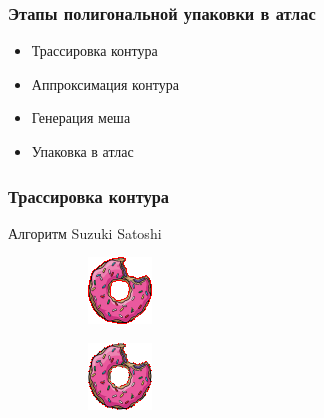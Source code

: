 \documentclass[10pt, unicode]{beamer}
\begin{document}
    \begin{frame}
        \frametitle{Этапы полигональной упаковки в атлас}
        \begin{itemize}
            \item Трассировка контура
            \item Аппроксимация контура
            \item Генерация меша
            \item Упаковка в атлас
        \end{itemize}
    \end{frame}
    \begin{frame}
        \frametitle{Трассировка контура}
        Алгоритм Suzuki Satoshi\cite{SuzukiAlgorithm}
        \begin{figure}[H]
            \centering
            \begin{subfigure}[l]{0.50\linewidth}
                \centering
                \includegraphics[scale=2]{donutpixel_contour_none.png}
            \end{subfigure}
            \begin{subfigure}{0.49\linewidth}
                \centering
                \includegraphics[scale=2]{donutpixel_contour_simple.png}
            \end{subfigure}
        \end{figure}
    \end{frame}
\end{document}
